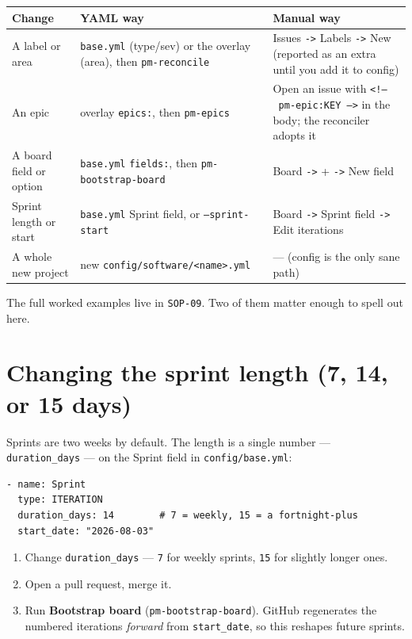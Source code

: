 \documentclass[11pt,a4paper]{report}
\newcommand{\code}[1]{\texttt{#1}}
\begin{document}
\begin{center}
\begin{longtable}{@{}p{3.2cm}p{4.6cm}p{4.6cm}@{}}
\toprule
\textbf{Change} & \textbf{YAML way} & \textbf{Manual way} \\
\midrule
\endhead
A label or area & \code{base.yml} (type/sev) or the overlay (area), then \code{pm-reconcile} & Issues \code{->} Labels \code{->} New (reported as an extra until you add it to config) \\
\addlinespace
An epic & overlay \code{epics:}, then \code{pm-epics} & Open an issue with \code{<!--~pm-epic:KEY~-->} in the body; the reconciler adopts it \\
\addlinespace
A board field or option & \code{base.yml} \code{fields:}, then \code{pm-bootstrap-board} & Board \code{->} + \code{->} New field \\
\addlinespace
Sprint length or start & \code{base.yml} Sprint field, or \code{--sprint-start} & Board \code{->} Sprint field \code{->} Edit iterations \\
\addlinespace
A whole new project & new \code{config/software/<name>.yml} & --- (config is the only sane path) \\
\bottomrule
\end{longtable}
\end{center}

The full worked examples live in \code{SOP-09}. Two of them matter enough to spell
out here.

\section{Changing the sprint length (7, 14, or 15 days)}

Sprints are two weeks by default. The length is a single number ---
\code{duration\_days} --- on the Sprint field in \code{config/base.yml}:

\begin{lstlisting}
- name: Sprint
  type: ITERATION
  duration_days: 14        # 7 = weekly, 15 = a fortnight-plus
  start_date: "2026-08-03"
\end{lstlisting}

\begin{enumerate}[leftmargin=1.6em,itemsep=3pt]
  \item Change \code{duration\_days} --- \code{7} for weekly sprints, \code{15}
        for slightly longer ones.
  \item Open a pull request, merge it.
  \item Run \textbf{Bootstrap board} (\code{pm-bootstrap-board}). GitHub
        regenerates the numbered iterations \emph{forward} from \code{start\_date},
        so this reshapes future sprints.
\end{enumerate}
\end{document}
